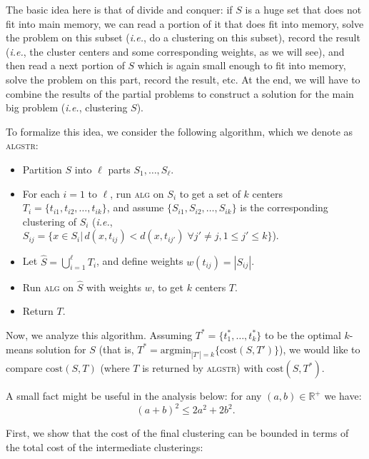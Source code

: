 The basic idea here is that of divide and conquer: if $S$ is a huge set that does not fit into main memory, we can read a portion of it that does fit into memory, solve the problem on this subset (\emph{i.e.}, do a clustering on this subset), record the result (\emph{i.e.}, the cluster centers and some corresponding weights, as we will see), and then read a next portion of $S$ which is again small enough to fit into memory, solve the problem on this part, record the result, etc. At the end, we will have to combine the results of the partial problems to construct a solution for the main big problem (\emph{i.e.}, clustering $S$).

To formalize this idea, we consider the following algorithm, which we denote as
\textsc{algstr}:

\begin{itemize}
	\item Partition $S$ into $\ell$ parts $S_1, \ldots, S_{\ell}$.
  \item For each $i=1$ to $\ell$, run \textsc{alg} on $S_i$ to get a set of $k$ centers
  $T_i=\{t_{i1}, t_{i2}, \ldots, t_{ik}\}$, and assume $\{S_{i1},S_{i2}, \ldots,
  S_{ik}\}$ is the corresponding clustering of $S_i$ (\emph{i.e.}, $S_{ij} = \{x\in
  S_i| \, d(x,t_{ij}) < d(x,t_{ij'}) \; \forall j'\neq j, 1\leq j'\leq k\}$).
  \item Let $\widehat{S}= \bigcup_{i=1}^{\ell}T_i$, and define weights $w(t_{ij}) =
  |S_{ij}|$.
  \item Run \textsc{alg} on $\widehat{S}$ with weights $w$, to get $k$ centers $T$.
  \item Return $T$.
\end{itemize}

Now, we analyze this algorithm. Assuming $T^{*}=\{t^{*}_1, \ldots, t^{*}_k\}$ to
be the optimal $k$-means solution for $S$ (that is, $T^{*} =
\mathrm{argmin}_{|T'|=k}\{\mathrm{cost}(S,T')\}$), we would like to compare
$\mathrm{cost}(S,T)$ (where $T$ is returned by \textsc{algstr}) with
$\mathrm{cost}(S,T^{*})$.

A small fact might be useful in the analysis below: for any ${(a,b) \in \mathbb{R}^+}$ we have: \[{(a+b)^2 \leq 2a^2 + 2b^2.}\]

 First, we show that the cost of the final clustering can be bounded in terms of the total cost of the intermediate clusterings:


